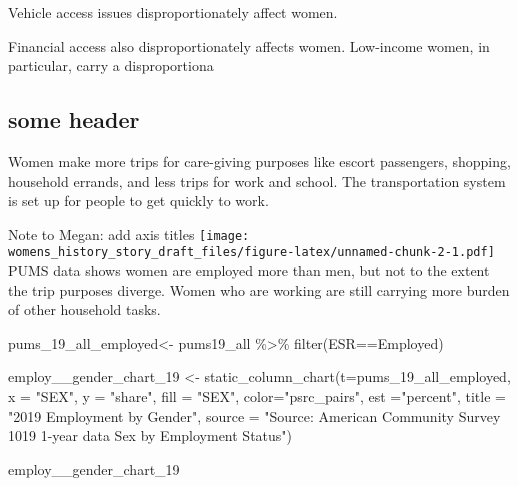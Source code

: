 \documentclass[
  12pt,
]{article}
\newenvironment{Shaded}{\begin{snugshade}}{\end{snugshade}}
\newcommand{\AttributeTok}[1]{\textcolor[rgb]{0.77,0.63,0.00}{#1}}
\newcommand{\FunctionTok}[1]{\textcolor[rgb]{0.00,0.00,0.00}{#1}}
\newcommand{\NormalTok}[1]{#1}
\newcommand{\OtherTok}[1]{\textcolor[rgb]{0.56,0.35,0.01}{#1}}
\newcommand{\SpecialCharTok}[1]{\textcolor[rgb]{0.00,0.00,0.00}{#1}}
\newcommand{\StringTok}[1]{\textcolor[rgb]{0.31,0.60,0.02}{#1}}
\begin{document}
Vehicle access issues disproportionately affect women.

Financial access also disproportionately affects women. Low-income
women, in particular, carry a disproportiona

\hypertarget{some-header}{%
\subsection{some header}\label{some-header}}

Women make more trips for care-giving purposes like escort passengers,
shopping, household errands, and less trips for work and school. The
transportation system is set up for people to get quickly to work.

Note to Megan: add axis titles
\texttt{[image: womens\_history\_story\_draft\_files/figure-latex/unnamed-chunk-2-1.pdf]}
PUMS data shows women are employed more than men, but not to the extent
the trip purposes diverge. Women who are working are still carrying more
burden of other household tasks.

\begin{Shaded}
\begin{Highlighting}[]
\NormalTok{pums\_19\_all\_employed}\OtherTok{\textless{}{-}}\NormalTok{ pums19\_all }\SpecialCharTok{\%\textgreater{}\%} \FunctionTok{filter}\NormalTok{(ESR}\SpecialCharTok{==}\StringTok{\textquotesingle{}Employed\textquotesingle{}}\NormalTok{) }


\NormalTok{employ\_\_gender\_chart\_19 }\OtherTok{\textless{}{-}} \FunctionTok{static\_column\_chart}\NormalTok{(}\AttributeTok{t=}\NormalTok{pums\_19\_all\_employed, }
                                    \AttributeTok{x =} \StringTok{"SEX"}\NormalTok{,}
                                    \AttributeTok{y =} \StringTok{"share"}\NormalTok{,}
                                    \AttributeTok{fill =} \StringTok{"SEX"}\NormalTok{,}
                                    \AttributeTok{color=}\StringTok{"psrc\_pairs"}\NormalTok{,}
                                    \AttributeTok{est =}\StringTok{"percent"}\NormalTok{,}
                                    \AttributeTok{title =} \StringTok{"2019 Employment by Gender"}\NormalTok{,}
                                    \AttributeTok{source =} \StringTok{"Source: American Community Survey 1019 1{-}year data Sex by Employment Status"}\NormalTok{)}

\NormalTok{employ\_\_gender\_chart\_19}
\end{Highlighting}
\end{Shaded}
\end{document}
